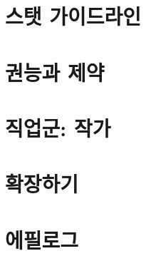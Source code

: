 \documentclass{report}
\begin{document}
	\chapter{스탯 가이드라인}
		
	
	\chapter{권능과 제약}
		
	
	\chapter{직업군: 작가}
		
	
	\chapter{확장하기}
		
	
	\chapter{에필로그}
		
\end{document}

